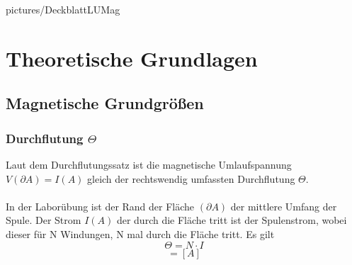 \documentclass[a4paper,twoside,12pt,DIV=13,BCOR=5mm,numbers=noenddot,cleardoublepage=empty]{scrbook}
\begin{document}
    \renewcommand{\baselinestretch}{1.25}
    \newcommand{\StudentA}{Philipp Hanser}
    \newcommand{\MatrNrA}{11775264}
    \newcommand{\StudentB}{Florian Strebl}
    \newcommand{\MatrNrB}{11712190}
    \newcommand{\StudentC}{Alexander Seiler}
    \newcommand{\MatrNrC}{11771276}

    \newcommand{\LUDatum}{02.05.2019}
    \newcommand{\LUGruppe}{Gr. 15}
    \newcommand{\LUBetreuer}{Univ.Lektor Dipl.-Ing. Martin Evanzin}  
    
    \large
    
    {pictures/DeckblattLUMag}


    \setcounter{tocdepth}{3}

    \setcounter{page}{0}
    \renewcommand{\thepage}{\roman{page}}
    \tableofcontents \cleardoublepage

    \setcounter{page}{1}
    \renewcommand{\thepage}{\arabic{page}}
    \setcounter{chapter}{0}

    \chapter{Theoretische Grundlagen}
    \section{Magnetische Grundgr\"o\ss{}en}
        \subsection{Durchflutung $\Theta$}
        Laut dem Durchflutungssatz ist die magnetische Umlaufspannung \\ 
        $V(\partial A) = I(A)$ gleich der rechtswendig umfassten Durchflutung
        $\Theta$.\\ \\
        In der Labor\"ubung ist der Rand der Fl\"ache $(\partial A)$ der mittlere Umfang der 
        Spule. Der Strom $I(A)$ der durch die Fl\"ache tritt ist der Spulenstrom, 
        wobei dieser f\"ur N Windungen, N mal durch die Fl\"ache tritt. Es gilt \\
        \begin{equation}
            \Theta = N \cdot I
        \end{equation}
        \begin{equation}
            [\Theta] = [A]
        \end{equation}
\end{document}
